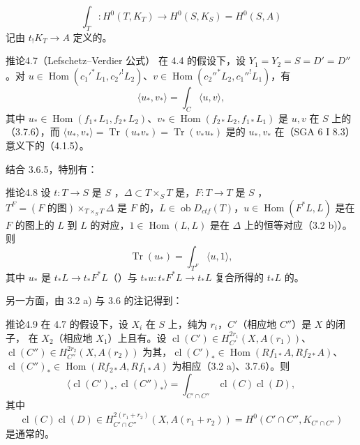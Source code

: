\[\int_T:H^0(T,K_T)\longrightarrow H^0(S,K_S)=H^0(S,A)\tag{4.6}\]
记由 $t_!K_T\to A$ 定义的。
\begin{SGAresult}{推论}{4.7（Lefschetz--Verdier 公式）}
在 4.4 的假设下，设 $Y_1=Y_2=S=D'=D''$。对 $u\in\operatorname{Hom}(c_1'^*L_1,c_2'^!L_2)$、$v\in\operatorname{Hom}(c_2''^*L_2,c_1''^!L_1)$，有
\[\langle u_*,v_*\rangle=\int_C\langle u,v\rangle,\tag{4.7.1}\]
其中 $u_*\in\operatorname{Hom}(f_{1*}L_1,f_{2*}L_2)$、$v_*\in\operatorname{Hom}(f_{2*}L_2,f_{1*}L_1)$ 是 $u,v$ 在 $S$ 上的（3.7.6），而 $\langle u_*,v_*\rangle=\operatorname{Tr}(u_*v_*)=\operatorname{Tr}(v_*u_*)$ 是的 $u_*,v_*$ 在（SGA 6 I 8.3）意义下的（4.1.5）。
\end{SGAresult}
结合 3.6.5，特别有：
\begin{SGAresult}{推论}{4.8}
设 $t:T\to S$ 是 $S$ ，$\Delta\subset T\times_ST$ 是，$F:T\to T$ 是 $S$ ，$T^F=(F\text{ 的图})\times_{T\times_ST}\Delta$ 是 $F$ 的，$L\in\operatorname{ob}D_{ctf}(T)$，$u\in\operatorname{Hom}(F^*L,L)$ 是在 $F$ 的图上的 $L$ 到 $L$ 的对应，$1\in\operatorname{Hom}(L,L)$ 是在 $\Delta$ 上的恒等对应（3.2 b)）。则
\[\operatorname{Tr}(u_*)=\int_{T^F}\langle u,1\rangle,\]
其中 $u_*$ 是 $t_*L\to t_*F^*L$（）与 $t_*u:t_*F^*L\to t_*L$ 复合所得的 $t_*L$ 的。
\end{SGAresult}
另一方面，由 3.2 a) 与 3.6 的注记得到：
\begin{SGAresult}{推论}{4.9}
在 4.7 的假设下，设 $X_i$ 在 $S$ 上，纯为 $r_i$，$C'$（相应地 $C''$）是 $X$ 的闭子，
在 $X_2$（相应地 $X_1$）上且有。设 $\operatorname{cl}(C')\in H_{C'}^{2r_1}(X,A(r_1))$、$\operatorname{cl}(C'')\in H_{C''}^{2r_2}(X,A(r_2))$ 为其，$\operatorname{cl}(C')_*\in\operatorname{Hom}(Rf_{1*}A,Rf_{2*}A)$、$\operatorname{cl}(C'')_*\in\operatorname{Hom}(Rf_{2*}A,Rf_{1*}A)$ 为相应（3.2 a)、3.7.6）。则
\[\langle\operatorname{cl}(C')_*,\operatorname{cl}(C'')_*\rangle=\int_{C'\cap C''}\operatorname{cl}(C)\operatorname{cl}(D),\]
其中
\[\operatorname{cl}(C)\operatorname{cl}(D)\in H_{C'\cap C''}^{2(r_1+r_2)}(X,A(r_1+r_2))=H^0(C'\cap C'',K_{C'\cap C''})\]
是通常的。
\end{SGAresult}
